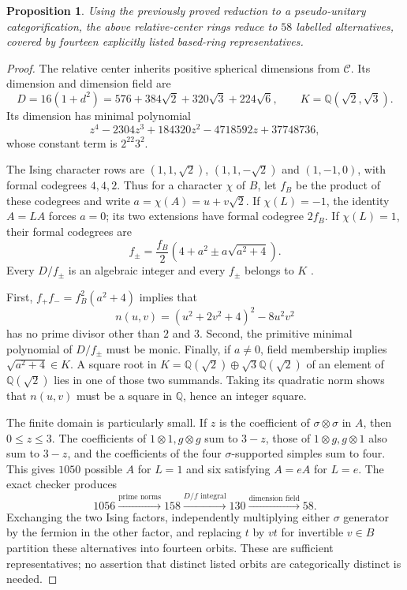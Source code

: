 \documentclass[11pt]{article}
\newtheorem{proposition}{Proposition}
\begin{document}
\begin{proposition}
Using the previously proved reduction to a pseudo-unitary
categorification, the above relative-center rings reduce to $58$
labelled alternatives, covered by fourteen explicitly listed based-ring
representatives.
\end{proposition}
\begin{proof}
The relative center inherits positive spherical dimensions from
$\mathcal C$. Its dimension and dimension field are
\[
 D=16(1+d^2)=576+384\sqrt2+320\sqrt3+224\sqrt6,
 \qquad K=\mathbb Q(\sqrt2,\sqrt3).
\]
Its dimension has minimal polynomial
\[
 z^4-2304z^3+184320z^2-4718592z+37748736,
\]
whose constant term is $2^{22}3^2$.

The Ising character rows are $(1,1,\sqrt2)$, $(1,1,-\sqrt2)$ and
$(1,-1,0)$, with formal codegrees $4,4,2$. Thus for a character $\chi$
of $B$, let $f_B$ be the product of these codegrees and write
$a=\chi(A)=u+v\sqrt2$. If $\chi(L)=-1$, the identity $A=LA$ forces
$a=0$; its two extensions have formal codegree $2f_B$. If
$\chi(L)=1$, their formal codegrees are
\[
 f_\pm=\frac{f_B}{2}\left(4+a^2\pm a\sqrt{a^2+4}\right).
\]
Every $D/f_\pm$ is an algebraic integer and every $f_\pm$ belongs to
$K$ \cite[Corollaries 2.14--2.15]{Ostrik}.

First, $f_+f_-=f_B^2(a^2+4)$ implies that
\[
 n(u,v)=(u^2+2v^2+4)^2-8u^2v^2
\]
has no prime divisor other than $2$ and $3$. Second, the primitive
minimal polynomial of $D/f_\pm$ must be monic. Finally, if $a\ne0$,
field membership implies $\sqrt{a^2+4}\in K$. A square root in
$K=\mathbb Q(\sqrt2)\oplus\sqrt3\mathbb Q(\sqrt2)$ of an element of
$\mathbb Q(\sqrt2)$ lies in one of those two summands. Taking its
quadratic norm shows that $n(u,v)$ must be a square in $\mathbb Q$,
hence an integer square.

The finite domain is particularly small. If $z$ is the coefficient of
$\sigma\otimes\sigma$ in $A$, then $0\le z\le3$. The coefficients
of $1\otimes1,g\otimes g$ sum to $3-z$, those of
$1\otimes g,g\otimes1$ also sum to $3-z$, and the coefficients of the
four $\sigma$-supported simples sum to four. This gives $1050$ possible
$A$ for $L=1$ and six satisfying $A=eA$ for $L=e$.
The exact checker produces
\[
1056\xrightarrow{\text{prime norms}}158
\xrightarrow{D/f\text{ integral}}130
\xrightarrow{\text{dimension field}}58.
\]
Exchanging the two Ising factors, independently multiplying either
$\sigma$ generator by the fermion in the other factor, and replacing
$t$ by $vt$ for invertible $v\in B$ partition these alternatives into
fourteen orbits. These are sufficient representatives; no assertion
that distinct listed orbits are categorically distinct is needed.
\end{proof}
\end{document}
